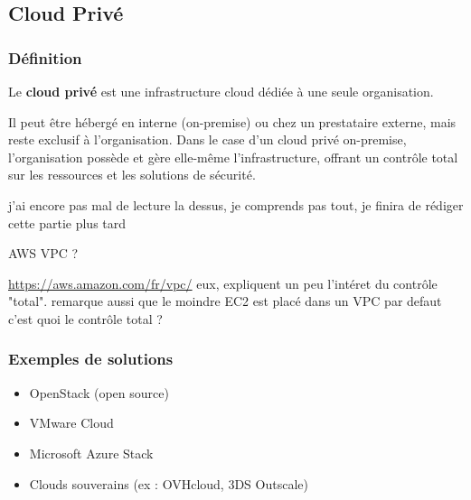 \documentclass{rapportClass} %
\begin{document}



\subsection{Cloud Privé}

\subsubsection{Définition}
Le \textbf{cloud privé} est une infrastructure cloud dédiée à une
seule organisation.


Il peut être hébergé en interne (on-premise) ou
chez un prestataire externe, mais reste exclusif à l’organisation. 
Dans le case d’un cloud privé on-premise, l’organisation possède et gère elle-même l’infrastructure, offrant un contrôle total sur les ressources 
et les solutions de sécurité.

{\color{green} j'ai encore pas mal de lecture la dessus, je comprends pas tout, je finira de rédiger cette partie plus tard}


{\color{red} AWS VPC ?}

{\color{red} \url{https://aws.amazon.com/fr/vpc/} eux, expliquent un peu l'intéret du contrôle "total".
remarque aussi que le moindre EC2 est placé dans un VPC par defaut }
{\color{red} c'est quoi le contrôle total ?}

\subsubsection{Exemples de solutions}
\begin{itemize}
    \item OpenStack (open source)
    \item VMware Cloud
    \item Microsoft Azure Stack
    \item Clouds souverains (ex : OVHcloud, 3DS Outscale)
\end{itemize}
\end{document}
